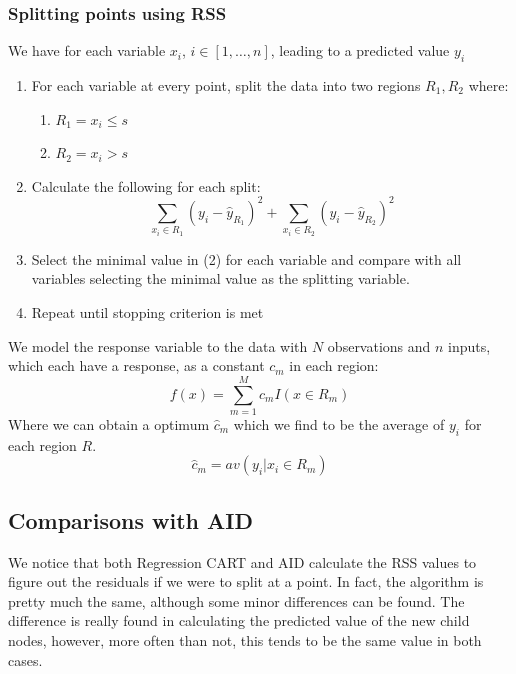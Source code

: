 \documentclass[11pt,a4paper]{report}
\begin{document}
\subsubsection{Splitting points using RSS}
We have for each variable $x_i$, $i \in [1, \dots, n]$, leading to a predicted value $y_i$ 
\begin{enumerate}
    \item For each variable at every point, split the data into two regions $R_1, R_2$ where:
    \begin{enumerate}
        \item $R_1 = x_i \leq s$
        \item $R_2 = x_i > s$
    \end{enumerate}
    
    \item Calculate the following for each split:
    \begin{equation}
     \sum_{x_i \in R_1} (y_i - \hat{y}_{R_1})^2  +  \sum_{x_i \in R_2} (y_i - \hat{y}_{R_2})^2
    \end{equation}
    
    \item Select the minimal value in (2) for each variable and compare with all variables selecting the minimal value as the splitting variable.
    
    \item Repeat until stopping criterion is met
\end{enumerate}

We model the response variable to the data with $N$ observations and $n$ inputs, which each have a response, as a constant $c_m$ in each region:
\begin{equation}
    f(x) = \sum_{m=1}^{M} c_m I (x \in R_m)
\end{equation}
Where we can obtain a optimum $\hat{c}_m$ which we find to be the average of $y_i$ for each region $R$.
\begin{equation}
    \hat{c}_m = av(y_i | x_i \in R_m)
\end{equation}

\subsection{Comparisons with AID}
We notice that both Regression CART and AID calculate the RSS values to figure out the residuals if we were to split at a point.
In fact, the algorithm is pretty much the same, although some minor differences can be found. 
The difference is really found in calculating the predicted value of the new child nodes, however, more often than not, this tends to be the same value in both cases.
\end{document}
